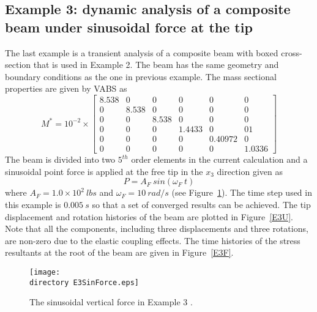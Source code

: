 \subsection{Example 3: dynamic analysis of a composite beam under sinusoidal force at the tip}

The last example is a transient analysis of a composite beam with boxed cross-section that is used in Example 2. The beam has the same geometry and boundary conditions as the one in previous example. The mass sectional properties are given by VABS \cite{Yu-etal:2002,Wang-Yu:2012} as
\begin{equation}
    \label{E3Mass}
    M^* = 10^{-2} \times \begin{bmatrix}
	8.538 & 0     & 0     & 0      & 0      & 0      \\
	0       & 8.538 & 0     & 0      & 0      & 0      \\
	0       & 0     & 8.538 & 0      & 0      & 0      \\
	0       & 0     & 0     & 1.4433  & 0  & 01 \\
	0       & 0     & 0     & 0  & 0.40972  &0 \\
	0       & 0     & 0     & 0 & 0 & 1.0336
\end{bmatrix}    
\end{equation}
The beam is divided into two $5^{th}$ order elements in the current calculation and a sinusoidal point force is applied at the free tip in the $x_3$ direction given as
\begin{equation}
    \label{E3AppliedForce}
    P = A_F~sin(\omega_F~t)
\end{equation}
where $A_F = 1.0 \times 10^2~lbs$ and $\omega_F = 10~rad/s$ (see Figure~\ref{E3SinForce}). The time step used in this example is $0.005~s$ so that a set of converged results can be achieved. The tip displacement and rotation histories of the beam are plotted in Figure~\ref{E3U}. Note that all the components, including three displacements and three rotations, are non-zero due to the elastic coupling effects. The time histories of the stress resultants at the root of the beam are given in Figure~\ref{E3F}.
\begin{figure}
    \centering
    \texttt{[image: \\directory E3SinForce.eps]}
    \caption{The sinusoidal vertical force in Example 3 .}
    \label{E3SinForce}
\end{figure}

